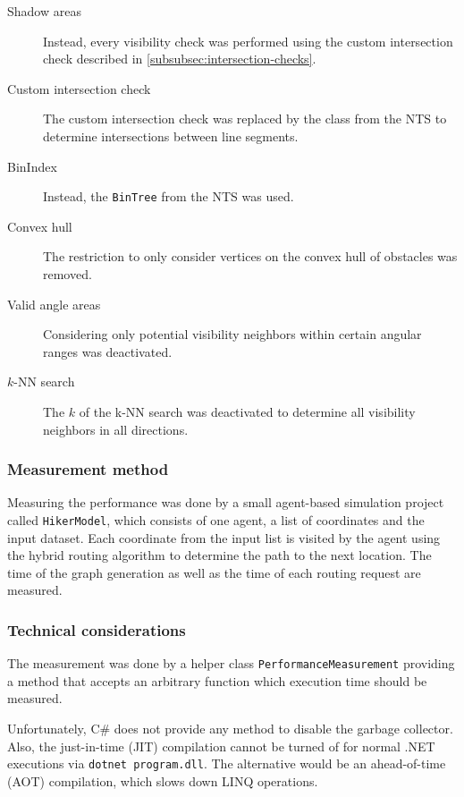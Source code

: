 			\begin{description}
				\item[Shadow areas] Instead, every visibility check was performed using the custom intersection check described in \cref{subsubsec:intersection-checks}.
				\item[Custom intersection check] The custom intersection check was replaced by the  class from the NTS to determine intersections between line segments.
				\item[BinIndex] Instead, the \texttt{BinTree} from the NTS was used.
				\item[Convex hull] The restriction to only consider vertices on the convex hull of obstacles was removed.
				\item[Valid angle areas] Considering only potential visibility neighbors within certain angular ranges was deactivated.
				\item[$k$-NN search] The $k$ of the k-NN search was deactivated to determine all visibility neighbors in all directions.
			\end{description}			
		\subsubsection{Measurement method}
		
			Measuring the performance was done by a small agent-based simulation project called \texttt{HikerModel}, which consists of one agent, a list of coordinates and the input dataset.
			Each coordinate from the input list is visited by the agent using the hybrid routing algorithm to determine the path to the next location.
			The time of the graph generation as well as the time of each routing request are measured.
		
		\subsubsection{Technical considerations}
		
			The measurement was done by a helper class \texttt{PerformanceMeasurement} providing a method that accepts an arbitrary function which execution time should be measured.
			
			Unfortunately, C\# does not provide any method to disable the garbage collector.
			Also, the just-in-time (JIT) compilation cannot be turned of for normal .NET executions via \texttt{dotnet program.dll}.
			The alternative would be an ahead-of-time (AOT) compilation, which slows down LINQ operations.

